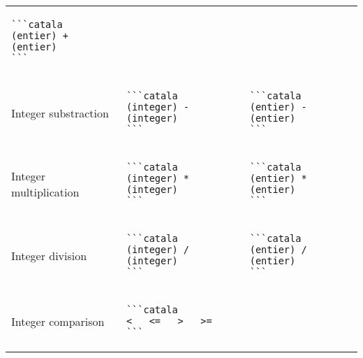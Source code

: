 \documentclass[a3paper,landscape]{article}
\begin{document}
\begin{multicols*}{2}
\begin{center}
\begin{tabular}{p{}p{}p{}}
\begin{verbatim}
```catala
(entier) + (entier)
```
\end{verbatim}
      \vspace*{-1.75em}
      \\
      Integer substraction            &
      \vspace*{-1.75em}
      \begin{verbatim}
```catala
(integer) - (integer)
```
\end{verbatim}
      \vspace*{-1.75em}
                                      &
      \vspace*{-1.75em}
      \begin{verbatim}
```catala
(entier) - (entier)
```
\end{verbatim}
      \vspace*{-1.75em}
      \\
      Integer multiplication          &
      \vspace*{-1.75em}
      \begin{verbatim}
```catala
(integer) * (integer)
```
\end{verbatim}
      \vspace*{-1.75em}
                                      &
      \vspace*{-1.75em}
      \begin{verbatim}
```catala
(entier) * (entier)
```
\end{verbatim}
      \vspace*{-1.75em}
      \\
      Integer division                &
      \vspace*{-1.75em}
      \begin{verbatim}
```catala
(integer) / (integer)
```
\end{verbatim}
      \vspace*{-1.75em}
                                      &
      \vspace*{-1.75em}
      \begin{verbatim}
```catala
(entier) / (entier)
```
\end{verbatim}
      \vspace*{-1.75em}
      \\
      Integer comparison              &
      \vspace*{-1.75em}
      \begin{verbatim}
```catala
<   <=   >   >=
```
\end{verbatim}
      \vspace*{-1.75em}

\end{tabular}
\end{center}
\end{multicols*}
\end{document}
